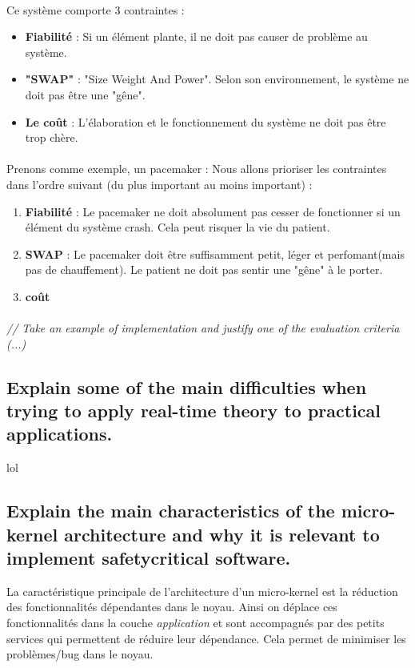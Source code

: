 \paragraph{}
Ce système comporte 3 contraintes :
\begin{itemize}
\item \textbf{Fiabilité} : Si un élément plante, il ne doit pas causer de problème au système.
\item \textbf{"SWAP"} : "Size Weight And Power". Selon son environnement, le système ne doit pas être une "gêne".
\item \textbf{Le coût} : L'élaboration et le fonctionnement du système ne doit pas être trop chère.
\end{itemize}
\paragraph{}
Prenons comme exemple, un pacemaker : 
Nous allons prioriser les contraintes dans l'ordre suivant (du plus important au moins important) :
\begin{enumerate}
\item \textbf{Fiabilité} : Le pacemaker ne doit absolument pas cesser de fonctionner si un élément du système crash. Cela peut risquer la vie du patient.
\item \textbf{SWAP} : Le pacemaker doit être suffisamment petit, léger et perfomant(mais pas de chauffement). Le patient ne doit pas sentir une "gêne" à le porter.
\item \textbf{coût} 
\end{enumerate}

\paragraph{}
\textit{// Take an example of implementation and justify one of the evaluation criteria  (...)}

\subsection{Explain some of the main difficulties when trying to apply real-time theory to practical applications.}
lol
\subsection{Explain the main characteristics of the micro-kernel architecture and why it is relevant to implement safetycritical
software.}
La caractéristique principale de l'architecture d'un micro-kernel est la réduction des fonctionnalités dépendantes dans le noyau. Ainsi on déplace ces fonctionnalités dans la couche \textit{application} et sont accompagnés par des petits services qui permettent de réduire leur dépendance. Cela permet de minimiser les problèmes/bug dans le noyau.

